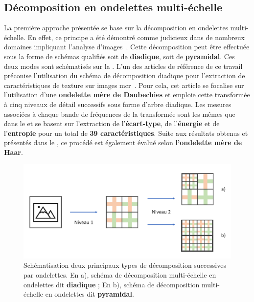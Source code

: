\subsection{Décomposition en ondelettes multi-échelle}
La première approche présentée se base sur la décomposition en ondelettes multi-échelle. En effet, ce principe a été démontré comme judicieux dans de nombreux domaines impliquant l'analyse d'images~\cite{Carvalho2004}. Cette décomposition peut être effectuée sous la forme de schémas qualifiés soit de \textbf{diadique}, soit de \textbf{pyramidal}. Ces deux modes sont schématisés sur la . L'un des articles de référence de ce travail préconise l'utilisation du schéma de décomposition diadique pour l'extraction de caractéristiques de texture sur images \gls{mcr}~\cite{Wiltgen2008}. Pour cela, cet article se focalise sur l'utilisation d'une \textbf{ondelette mère de Daubechies} et emploie cette transformée à cinq niveaux de détail successifs sous forme d'arbre diadique. Les mesures associées à chaque bande de fréquences de la transformée sont les mêmes que dans le  et se basent sur l'extraction de l'\textbf{écart-type}, de l'\textbf{énergie} et de l'\textbf{entropie} pour un total de \textbf{39 caractéristiques}. Suite aux résultats obtenus et présentés dans le , ce procédé est également évalué selon \textbf{l'ondelette mère de Haar}.\par

\begin{figure}[H]
    \centering
    \includegraphics[width=\textwidth]{contents/chapter_6/resources/scheme_image_improvement_dwt_decomposition.pdf}
    \caption{Schématisation deux principaux types de décomposition successives par ondelettes. En a), schéma de décomposition multi-échelle en ondelettes dit \textbf{diadique} ; En b), schéma de décomposition multi-échelle en ondelettes dit \textbf{pyramidal}.}
    \label{fig:scheme_image_improvement_dwt_decomposition}
\end{figure}\par

